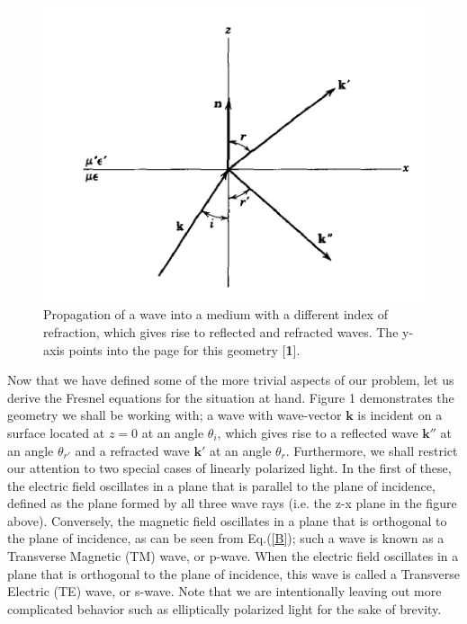\documentclass[preprint, onecolumn, amsmath, amssymb, aps]{revtex4-1}
\numberwithin{equation}{section}
\begin{document}
\begin{figure}[h]
\centering
\includegraphics[width=.75\linewidth]{1}
\caption{Propagation of a wave into a medium with a different index of refraction, which gives rise to reflected and refracted waves. The y-axis points into the page for this geometry [\textbf{1}].}
\label{fig:lat}
\end{figure}
Now that we have defined some of the more trivial aspects of our problem, let us derive the Fresnel equations for the situation at hand. Figure 1 demonstrates the geometry we shall be working with; a wave with wave-vector $\mathbf{k}$ is incident on a surface located at $z = 0$ at an angle $\theta_{i}$, which gives rise to a reflected wave $\mathbf{k}''$ at an angle $\theta_{r'}$ and a refracted wave $\mathbf{k}'$ at an angle $\theta_{r}$. Furthermore, we shall restrict our attention to two special cases of linearly polarized light. In the first of these, the electric field oscillates in a plane that is parallel to the plane of incidence, defined as the plane formed by all three wave rays (i.e. the z-x plane in the figure above). Conversely, the magnetic field oscillates in a plane that is orthogonal to the plane of incidence, as can be seen from Eq.(\ref{B}); such a wave is known as a Transverse Magnetic (TM) wave, or p-wave. When the electric field oscillates in a plane that is orthogonal to the plane of incidence, this wave is called a Transverse Electric (TE) wave, or s-wave. Note that we are intentionally leaving out more complicated behavior such as elliptically polarized light for the sake of brevity. \\
\end{document}
